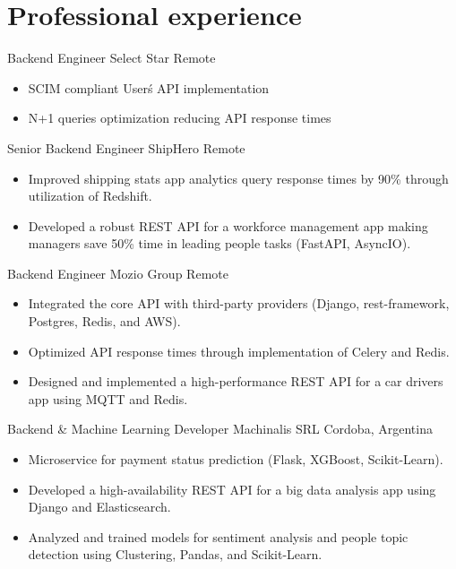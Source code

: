 
\section{Professional experience}
    {Backend Engineer} %
    {Select Star} %
    {Remote} %
    {}
    {
      \begin{itemize} %
        \item {SCIM compliant User\'s API implementation}
        \item {N+1 queries optimization reducing API response times}
      \end{itemize}
    }
    {Senior Backend Engineer} %
    {ShipHero} %
    {Remote} %
    {}
    {
      \begin{itemize} %
        \item {Improved shipping stats app analytics query response times by 90\% through utilization of Redshift.}
        \item {Developed a robust REST API for a workforce management app making managers save 50\% time in leading people tasks (FastAPI, AsyncIO).}
      \end{itemize}
    }
    {Backend Engineer} %
    {Mozio Group} %
    {Remote} %
    {}
    {
      \begin{itemize} %
        \item {Integrated the core API with third-party providers (Django, rest-framework, Postgres, Redis, and AWS).}
        \item {Optimized API response times through implementation of Celery and Redis.}
        \item {Designed and implemented a high-performance REST API for a car drivers app using MQTT and Redis.}
      \end{itemize}
    }
    {Backend \& Machine Learning Developer} %
    {Machinalis SRL} %
    {Cordoba, Argentina} %
    {}
    {
      \begin{itemize} %
        \item {Microservice for payment status prediction (Flask, XGBoost, Scikit-Learn).}
        \item {Developed a high-availability REST API for a big data analysis app using Django and Elasticsearch.}
        \item {Analyzed and trained models for sentiment analysis and people topic detection using Clustering, Pandas, and Scikit-Learn.}
      \end{itemize}
    }

